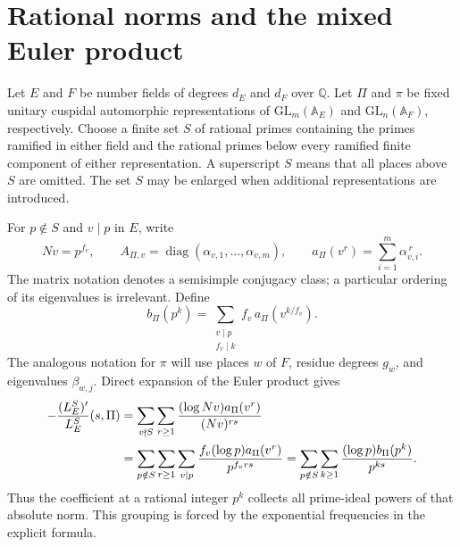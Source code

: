 \documentclass[11pt,reqno]{amsart}
\numberwithin{equation}{section}
\theoremstyle{definition}
\theoremstyle{remark}
\newcommand{\Q}{\mathbb Q}
\begin{document}
\section{Rational norms and the mixed Euler product}\label{id:sec-coefficients}

Let $E$ and $F$ be number fields of degrees $d_E$ and $d_F$ over $\Q$.
Let $\Pi$ and $\pi$ be fixed unitary cuspidal automorphic representations of
$\mathrm{GL}_m(\mathbb A_E)$ and $\mathrm{GL}_{n}(\mathbb A_F)$, respectively.
Choose a finite set $S$ of rational primes containing the primes ramified in
either field and the rational primes below every ramified finite component
of either representation. A superscript $S$ means that all places above
$S$ are omitted. The set $S$ may be enlarged when additional representations
are introduced.

For $p\notin S$ and $v\mid p$ in $E$, write
\begin{equation}\label{id:local-data}
 Nv=p^{f_v},\qquad
 A_{\Pi,v}=\operatorname{diag}(\alpha_{v,1},\ldots,\alpha_{v,m}),\qquad
 a_\Pi(v^r)=\sum_{i=1}^{m}\alpha_{v,i}^{\,r}.
\end{equation}
The matrix notation denotes a semisimple conjugacy class; a particular
ordering of its eigenvalues is irrelevant. Define
\begin{equation}\label{id:grouped-coefficients}
 b_\Pi(p^k)=
 \sum_{\substack{v\mid p\\ f_v\mid k}}
 f_v\,a_\Pi(v^{k/f_v}).
\end{equation}
The analogous notation for $\pi$ will use places $w$ of $F$, residue degrees
$g_w$, and eigenvalues $\beta_{w,j}$. Direct expansion of the Euler product
gives
\begin{align}
 -\frac{(L_E^S)'}{L_E^S}(s,\Pi)
 &=\sum_{v\nmid S}\sum_{r\ge1}
   \frac{(\log Nv)a_\Pi(v^r)}{(Nv)^{rs}}\notag\\
 &=\sum_{p\notin S}\sum_{r\ge1}\sum_{v\mid p}
   \frac{f_v(\log p)a_\Pi(v^r)}{p^{f_vrs}}
 =\sum_{p\notin S}\sum_{k\ge1}
   \frac{(\log p)b_\Pi(p^k)}{p^{ks}}.
 \label{id:logarithmic-coefficients}
\end{align}
Thus the coefficient at a rational integer $p^k$ collects all prime-ideal
powers of that absolute norm. This grouping is forced by the exponential
frequencies in the explicit formula.
\end{document}

